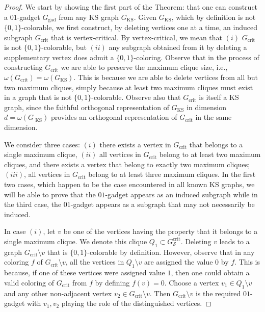\documentclass[twocolumn, a4paper, superscriptaddress,nofootinbib, accepted=2020-08-07, hyperref]{quantumarticle}
\begin{document}
\begin{proof}
We start by showing the first part of the Theorem: that one can construct a $01$-gadget $G_{\text{gad}}$ from any KS graph $G_\text{KS}$.  Given $G_\text{KS}$, which by definition is not $\{0,1\}$-colorable, we first construct, by deleting vertices one at a time, an induced subgraph $G_{\text{crit}}$ that is vertex-critical. By vertex-critical, we mean that $(i)$ $G_{\text{crit}}$ is not $\{0,1\}$-colorable, but $(ii)$ any subgraph obtained from it by deleting a supplementary vertex does admit a $\{0,1\}$-coloring. Observe that in the process of constructing $G_{\text{crit}}$ we are able to preserve the maximum clique size, i.e., $\omega(G_{\text{crit}}) = \omega(G_{\text{KS}})$. This is because we are able to delete vertices from all but two maximum cliques, simply because at least two maximum cliques must exist in a graph that is not $\{0,1\}$-colorable. Observe also that $G_{\text{crit}}$ is itself a KS graph, since the faithful orthogonal representation of $G_\text{KS}$ in dimension $d=\omega(G_{\text{	KS}})$ provides an orthogonal representation of $G_\text{crit}$ in the same dimension. 

We consider three cases: $(i)$ there exists a vertex in $G_{\text{crit}}$ that belongs to a single maximum clique, $(ii)$ all vertices in $G_{\text{crit}}$ belong to at least two maximum cliques, and there exists a vertex that belong to exactly two maximum cliques; $(iii)$, all vertices in $G_{\text{crit}}$ belong to at least three maximum cliques. In the first two cases, which happen to be the case encountered in all known KS graphs, we will be able to prove that the $01$-gadget appears as an induced subgraph while in the third case, the $01$-gadget appears as a subgraph that may not necessarily be induced. 

In case $(i)$, let $v$ be one of the vertices having the property that it belongs to a single maximum clique. We denote this clique $Q_1 \subset G_{\mathcal{S}}^{\text{crit}}$. Deleting $v$ leads to a graph $G_{\text{crit}} \setminus v$ that is $\{0,1\}$-colorable by definition. However, observe that in any coloring $f$ of $G_{\text{crit}} \setminus v$, all the vertices in $Q_1 \setminus v$ are assigned the value $0$ by $f$. This is because, if one of these vertices were assigned value $1$, then one could obtain a valid coloring of $G_{\text{crit}}$ from $f$ by defining $f(v) = 0$. Choose a vertex $v_1\in Q_1 \setminus v$ and any other non-adjacent vertex $v_2\in G_{\text{crit}} \setminus v$. Then $G_{\text{crit}} \setminus v$ is the required $01$-gadget with $v_1, v_2$ playing the role of the distinguished vertices.  


\end{proof}
\end{document}
